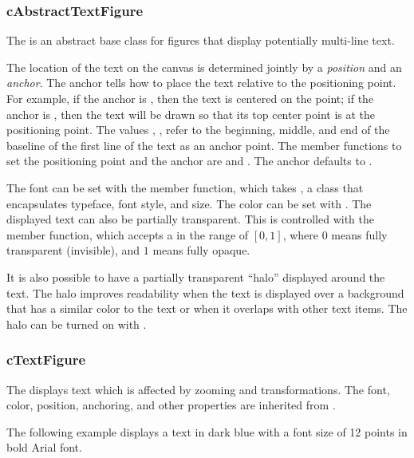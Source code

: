 \subsubsection{cAbstractTextFigure}
\label{sec:graphics:abstracttextfigure}

The  is an abstract base class for figures that
display potentially multi-line text.

The location of the text on the canvas is determined jointly by a
\textit{position} and an \textit{anchor}. The anchor tells how to
place the text relative to the positioning point. For example,
if the anchor is , then the text is centered on the point;
if the anchor is , then the text will be drawn so that its top
center point is at the positioning point. The values
, ,
 refer to the beginning, middle, and end of the
baseline of the first line of the text as an anchor point. The member
functions to set the positioning point and the anchor are
 and . The anchor defaults to
.

The font can be set with the  member function, which takes
, a class that encapsulates typeface, font style, and
size. The color can be set with . The displayed text can
also be partially transparent. This is controlled with the 
member function, which accepts a  in the range of $[0,1]$, where $0$ means
fully transparent (invisible), and $1$ means fully opaque.

It is also possible to have a partially transparent ``halo'' displayed around
the text. The halo improves readability when the text is displayed over a
background that has a similar color to the text or when it overlaps with other
text items. The halo can be turned on with .


\subsubsection{cTextFigure}
\label{sec:graphics:textfigure}

The  displays text which is affected by zooming and
transformations. The font, color, position, anchoring, and other properties are
inherited from .

The following example displays a text in dark blue with a font size of 12 points
in bold Arial font.

